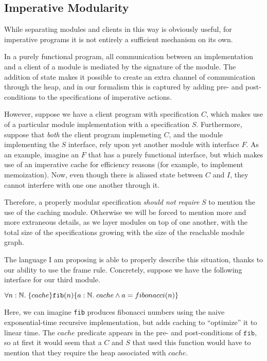 \subsection{Imperative Modularity}

While separating modules and clients in this way is obviously useful,
for imperative programs it is not entirely a sufficient mechanism on
its own.

In a purely functional program, all communication between an
implementation and a client of a module is mediated by the signature
of the module. The addition of state makes it possible to create an
extra channel of communication through the heap, and in our formalism
this is captured by adding pre- and post-conditions to the
specifications of imperative actions.

However, suppose we have a client program with specification $C$,
which makes use of a particular module implementation with a
specification $S$. Furthermore, suppose that \emph{both} the client
program implemeting $C$, and the module implementing the $S$
interface, rely upon yet another module with interface $F$. As an
example, imagine an $F$ that has a purely functional interface, but
which makes use of an imperative cache for efficiency reasons (for
example, to implement memoization). Now, even though there is aliased
state between $C$ and $I$, they cannot interfere with one one another
through it.

Therefore, a properly modular specification \emph{should not require}
$S$ to mention the use of the caching module. Otherwise we will be
forced to mention more and more extraneous details, as we layer
modules on top of one another, with the total size of the
specifications growing with the size of the reachable module graph.

The language I am proposing is able to properly describe this
situation, thanks to our ability to use the frame rule. Concretely,
suppose we have the following interface for our third module.

\begin{tabbing}
$\forall n:\mathbb{N}.\; \{{cache}\}{\mathtt{fib}(n)}\{{a:\mathbb{N}}.\;{cache \land a = fibonacci(n)}\}$ \\
\end{tabbing} 

Here, we can imagine \texttt{fib} produces fibonacci numbers using the
naive exponential-time recursive implementation, but adds caching to
``optimize'' it to linear time. The $cache$ predicate appears in the
pre- and post-conditions of $\mathtt{fib}$, so at first it would seem
that a $C$ and $S$ that used this function would have to mention that
they require the heap associated with $cache$.


